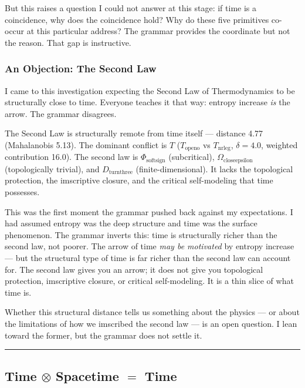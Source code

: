 \documentclass[12pt,a4paper]{article}
\begin{document}
But this raises a question I could not answer at this stage: if time is a coincidence, why does the coincidence hold? Why do these five primitives co-occur at this particular address? The grammar provides the coordinate but not the reason. That gap is instructive.

\subsubsection{An Objection: The Second Law}

I came to this investigation expecting the Second Law of Thermodynamics to be structurally close to time. Everyone teaches it that way: entropy increase \emph{is} the arrow. The grammar disagrees.

The Second Law is structurally remote from time itself --- distance 4.77 (Mahalanobis 5.13). The dominant conflict is $T$ ($T_{\text{openo}}$ vs $T_{\text{nrleg}}$, $\delta = 4.0$, weighted contribution 16.0). The second law is $\Phi_{\text{softsign}}$ (subcritical), $\Omega_{\text{closeepsilon}}$ (topologically trivial), and $D_{\text{turnthree}}$ (finite-dimensional). It lacks the topological protection, the imscriptive closure, and the critical self-modeling that time possesses.

This was the first moment the grammar pushed back against my expectations. I had assumed entropy was the deep structure and time was the surface phenomenon. The grammar inverts this: time is structurally richer than the second law, not poorer. The arrow of time \emph{may be motivated} by entropy increase --- but the structural type of time is far richer than the second law can account for. The second law gives you an arrow; it does not give you topological protection, imscriptive closure, or critical self-modeling. It is a thin slice of what time is.

Whether this structural distance tells us something about the physics --- or about the limitations of how we imscribed the second law --- is an open question. I lean toward the former, but the grammar does not settle it.

\begin{center}
\rule{0.5\textwidth}{0.4pt}
\end{center}

\subsection{Time $\otimes$ Spacetime $=$ Time}
\end{document}
